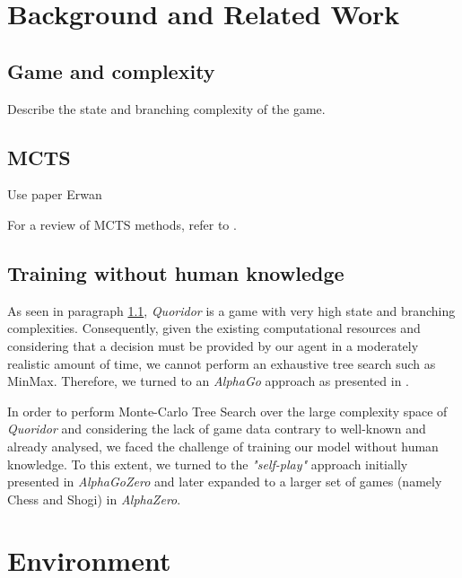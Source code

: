 \documentclass[journal, a4paper]{IEEEtran}
\begin{document}
\section{Background and Related Work}
\label{sec:background}

\subsection{Game and complexity}
\label{ssec:complexity}
Describe the state and branching complexity of the game.

\subsection{MCTS}
\label{ssec:mcts}
Use paper Erwan \cite{mc-rave}

For a review of MCTS methods, refer to \cite{mcts-review}.

\subsection{Training without human knowledge}
\label{ssec:human-knowledge}

As seen in paragraph \ref{ssec:complexity}, \textit{Quoridor} is a game with very high state and branching complexities. Consequently, given the existing computational resources and considering that a decision must be provided by our agent in a moderately realistic amount of time, we cannot perform an exhaustive tree search such as MinMax. Therefore, we turned to an \textit{AlphaGo} approach as presented in \cite{alphago}.

In order to perform Monte-Carlo Tree Search over the large complexity space of \textit{Quoridor} and considering the lack of game data contrary to well-known and already analysed, we faced the challenge of training our model without human knowledge. To this extent, we turned to the \textit{"self-play"} approach initially presented in  \textit{AlphaGoZero}\cite{alphagozero} and later expanded to a larger set of games (namely Chess and Shogi) in \textit{AlphaZero}\cite{alphazero}.

\section{Environment}
\label{sec:environment}
\end{document}

